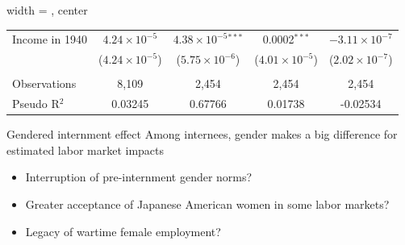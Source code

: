 \documentclass{beamer}
\begin{document}
\begin{frame}
\begin{table}[htbp]
\begin{adjustbox}{width = \textwidth, center}
\begin{tabular}{lcccc}
           Income in 1940      & $4.24\times 10^{-5}$    & $4.38\times 10^{-5}$$^{***}$  & 0.0002$^{***}$          & $-3.11\times 10^{-7}$\\    
                               & ($4.24\times 10^{-5}$)  & ($5.75\times 10^{-6}$)        & ($4.01\times 10^{-5}$)  & ($2.02\times 10^{-7}$)\\    
            \\
           Observations        & 8,109                   & 2,454                         & 2,454                   & 2,454\\  
           Pseudo R$^2$        & 0.03245                 & 0.67766                       & 0.01738                 & -0.02534\\  
           \bottomrule
        \end{tabular}
     \end{adjustbox}
  \end{table}
\end{frame}

\begin{frame}{Gendered internment effect}
  Among internees, gender makes a big difference for estimated labor market impacts
  \begin{itemize}
    \item Interruption of pre-internment gender norms?
    \item Greater acceptance of Japanese American women in some labor markets?
    \item Legacy of wartime female employment?
  \end{itemize}

\end{frame}
\end{document}

